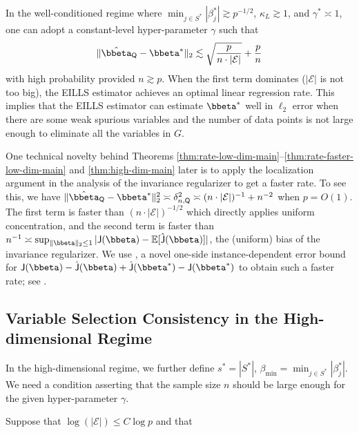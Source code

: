 \documentclass[10pt]{article}
\numberwithin{equation}{section}
\newcommand{\aosversion}[2]{\iftoggle{vaos}{#1}{#2}}
\newcommand{\blue}[1]{{\color{blue} #1}}
\begin{document}
{In the well-conditioned regime where $\min_{j\in S^*} |\beta_j^*| \gtrsim p^{-1/2}$, $\kappa_L\gtrsim 1$, and $\gamma^*\asymp 1$, one can adopt a constant-level hyper-parameter $\gamma$ such that
\begin{align*}
    \|\hat{\bbeta}_{\mathsf{Q}} - \bbeta^*\|_2 \lesssim \sqrt{\frac{p}{n\cdot |\mathcal{E}|}} + \frac{p}{n}
\end{align*} with high probability provided $n \gtrsim p$. When the first term dominates ($|\mathcal{E}|$ is not too big), the EILLS estimator achieves an optimal linear regression rate. This implies that the EILLS estimator can estimate $\bbeta^*$ well in $\ell_2$ error when there are some weak spurious variables and the number of data points is not large enough to eliminate all the variables in $G$. 

One technical novelty behind Theorems \ref{thm:rate-low-dim-main}--\ref{thm:rate-faster-low-dim-main} and \cref{thm:high-dim-main} later is to apply the localization argument in the analysis of the invariance regularizer to get a faster rate. To see this, we have $\|\hat{\bbeta}_{\mathsf{Q}} - \bbeta^*\|_2^2 \asymp \delta_{n,\mathsf{Q}}^2 \asymp (n\cdot |\mathcal{E}|)^{-1} + n^{-2}$ when $p=O(1)$. The first term is faster than $(n\cdot |\mathcal{E}|)^{-1/2}$ which directly applies uniform concentration, and the second term is faster than $n^{-1} \asymp \sup_{\|\bbeta\|_2 \le 1} |\mathsf{J}(\bbeta) - \mathbb{E}[\hat{\mathsf{J}}(\bbeta)]|$, the (uniform) bias of the invariance regularizer. We use \aosversion{Lemma~\blue{C.4}}{\cref{lemma:instance-dependent-bound-j-lowdim}}, a novel one-side instance-dependent error bound for $\mathsf{J}(\bbeta) - \hat{\mathsf{J}}(\bbeta) + \hat{\mathsf{J}}(\bbeta^*) - \mathsf{J}(\bbeta^*)$ to obtain such a faster rate; see \aosversion{Appendix~\blue{C.3}}{\cref{sec:proof-thm2}}. 

\subsection{Variable Selection Consistency in the High-dimensional Regime}
\label{subsec:theory-high-dim}

 In the high-dimensional regime, we further define $s^* = |S^*|$, $\beta_{\min} = \min_{j\in S^*} |\beta_j^*|$. We need a condition asserting that the sample size $n$ should be large enough for the given hyper-parameter $\gamma$.

\begin{condition}
\label{cond6-n-req-main}
    Suppose that $\log(|\mathcal{E}|)\le C\log p$ and that 
    

\end{condition}}
\end{document}
